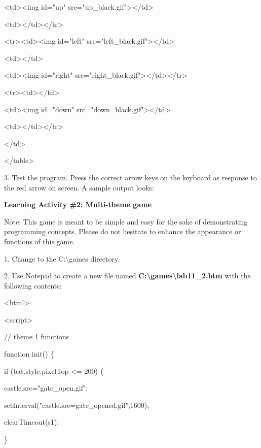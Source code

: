 \documentclass[
]{article}
\begin{document}
\textless td\textgreater\textless img id="up"
src="up\_black.gif"\textgreater\textless/td\textgreater{}

\textless td\textgreater\textless/td\textgreater\textless/tr\textgreater{}

\textless tr\textgreater\textless td\textgreater\textless img id="left"
src="left\_black.gif"\textgreater\textless/td\textgreater{}

\textless td\textgreater\textless/td\textgreater{}

\textless td\textgreater\textless img id="right"
src="right\_black.gif"\textgreater\textless/td\textgreater\textless/tr\textgreater{}

\textless tr\textgreater\textless td\textgreater\textless/td\textgreater{}

\textless td\textgreater\textless img id="down"
src="down\_black.gif"\textgreater\textless/td\textgreater{}

\textless td\textgreater\textless/td\textgreater\textless/tr\textgreater{}

\textless/td\textgreater{}

\textless/table\textgreater{}

3. Test the program. Press the correct arrow keys on the keyboard as
response to the red arrow on screen. A sample output looks:

\textbf{Learning Activity \#2: Multi-theme game}

Note: This game is meant to be simple and easy for the sake of
demonstrating programming concepts. Please do not hesitate to enhance
the appearance or functions of this game.

1. Change to the C:\textbackslash games directory.

2. Use Notepad to create a new file named
\textbf{C:\textbackslash games\textbackslash lab11\_2.htm} with the
following contents:

\textless html\textgreater{}

\textless script\textgreater{}

// theme 1 functions

function init() \{

if (bat.style.pixelTop \textless= 200) \{

castle.src="gate\_open.gif";

setInterval("castle.src=\textquotesingle gate\_opened.gif\textquotesingle",1600);

clearTimeout(s1);

\}
\end{document}
